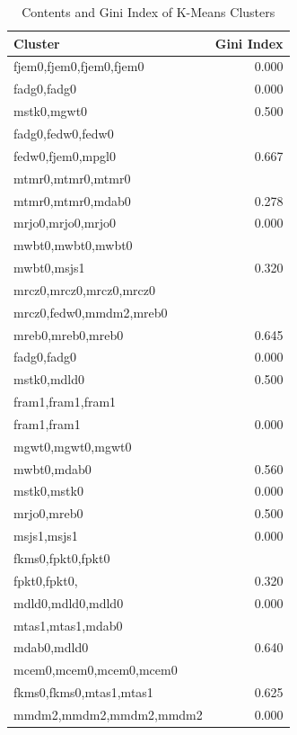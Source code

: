 \documentclass[12pt]{article}
\begin{document}
\begin{table}\scriptsize
\begin{center}
\caption{Contents and Gini Index of K-Means Clusters}
\begin{tabular}{lr}
\\
\toprule
Cluster & Gini Index \\
\midrule
fjem0,fjem0,fjem0,fjem0 & 0.000 \\ \midrule
fadg0,fadg0 & 0.000 \\ \midrule
mstk0,mgwt0 & 0.500 \\ \midrule
fadg0,fedw0,fedw0 & \\
fedw0,fjem0,mpgl0 & 0.667 \\ \midrule
mtmr0,mtmr0,mtmr0 & \\
mtmr0,mtmr0,mdab0 & 0.278 \\ \midrule
mrjo0,mrjo0,mrjo0 & 0.000 \\ \midrule
mwbt0,mwbt0,mwbt0 & \\
mwbt0,msjs1 & 0.320 \\ \midrule
mrcz0,mrcz0,mrcz0,mrcz0 & \\
mrcz0,fedw0,mmdm2,mreb0 & \\
mreb0,mreb0,mreb0 & 0.645 \\ \midrule
fadg0,fadg0 & 0.000 \\ \midrule
mstk0,mdld0 & 0.500 \\ \midrule
fram1,fram1,fram1 & \\
fram1,fram1 & 0.000 \\ \midrule
mgwt0,mgwt0,mgwt0 & \\
mwbt0,mdab0 & 0.560 \\ \midrule
mstk0,mstk0 & 0.000 \\ \midrule
mrjo0,mreb0 & 0.500 \\ \midrule
msjs1,msjs1 & 0.000 \\ \midrule
fkms0,fpkt0,fpkt0 & \\
fpkt0,fpkt0, & 0.320 \\ \midrule
mdld0,mdld0,mdld0 & 0.000 \\ \midrule
mtas1,mtas1,mdab0 & \\
mdab0,mdld0 & 0.640 \\ \midrule
mcem0,mcem0,mcem0,mcem0 & \\
fkms0,fkms0,mtas1,mtas1 & 0.625 \\ \midrule
mmdm2,mmdm2,mmdm2,mmdm2 & 0.000 \\
\bottomrule
\end{tabular}
\end{center}
\end{table}
\label{gini}
\end{document}
